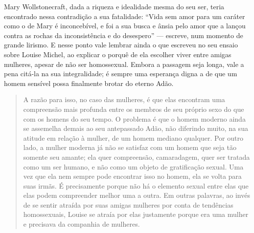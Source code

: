 Mary Wollstonecraft, dada
a riqueza e idealidade mesma do seu ser, teria encontrado nessa
contradição a sua fatalidade: ``Vida sem amor para um caráter como o de
Mary é inconcebível, e foi a sua busca e ânsia pelo amor que a lançou
contra as rochas da inconsistência e do desespero'' --- escreve, num
momento de grande lirismo. E nesse ponto vale lembrar ainda o que
escreveu no seu ensaio sobre Louise Michel, ao explicar o porquê de ela
escolher viver entre amigas mulheres, apesar de não ser homossexual.
Embora a passagem seja longa, vale a pena citá-la na sua integralidade;
é sempre uma esperança digna a de que um homem sensível possa finalmente
brotar do eterno Adão.

\begin{quote}
A razão para isso, no caso das mulheres, é que elas encontram uma
compreensão mais profunda entre os membros de seu próprio sexo do que
com os homens do seu tempo. O problema é que o homem moderno ainda se
assemelha demais ao seu antepassado Adão, não diferindo muito, na sua
atitude em relação à mulher, de um homem mediano qualquer. Por outro
lado, a mulher moderna já não se satisfaz com um homem que seja tão
somente seu amante; ela quer compreensão, camaradagem, quer ser tratada
como um ser humano, e não como um objeto de gratificação sexual. Uma vez
que ela nem sempre pode encontrar isso no homem, ela se volta para suas
irmãs. É precisamente porque não há o elemento sexual entre elas que
elas podem compreender melhor uma a outra. Em outras palavras, ao invés
de se sentir atraída por suas amigas mulheres por conta de tendências
homossexuais, Louise se atraía por elas justamente porque era uma mulher
e precisava da companhia de mulheres.
\end{quote}

